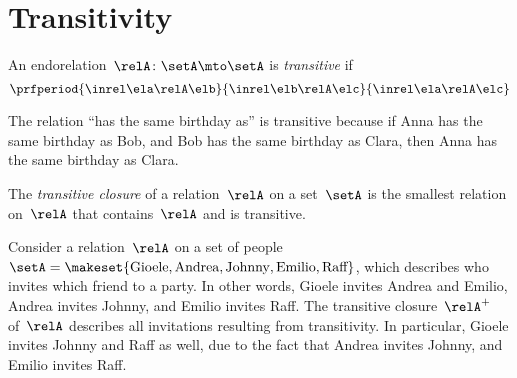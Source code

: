 
\section{Transitivity}

\begin{ctdefinition}
	\label{def:endo_transitive}
	An endorelation~$\relA\colon \setA\mto \setA$ is \emph{transitive} if
	\begin{equation}
		\prfperiod{
			\inrel \ela \relA \elb
		}{
			\inrel \elb \relA \elc
		}{
			\inrel \ela \relA \elc
		}
	\end{equation}
\end{ctdefinition}

\begin{example}
	The relation ``has the same birthday as'' is transitive because if Anna has the same birthday as Bob, and Bob has the same birthday as Clara, then Anna has the same birthday as Clara.
\end{example}

\begin{ctdefinition}
	\label{def:transitive-closure}
	The \emph{transitive closure} of a relation~$\relA$ on a set~$\setA$ is the smallest relation on~$\relA$ that contains~$\relA$ and is transitive.
\end{ctdefinition}


\begin{example}
	Consider a relation~$\relA$ on a set of people~$\setA=\makeset{\text{Gioele}, \text{Andrea}, \text{Johnny}, \text{Emilio}, \text{Raff}}$, which describes who invites which friend to a party.
	In other words, Gioele invites Andrea and Emilio, Andrea invites Johnny, and Emilio invites Raff.
	The transitive closure~$\relA^+$ of~$\relA$ describes all invitations resulting from transitivity.
	In particular, Gioele invites Johnny and Raff as well, due to the fact that Andrea invites Johnny, and Emilio invites Raff.
\end{example}
